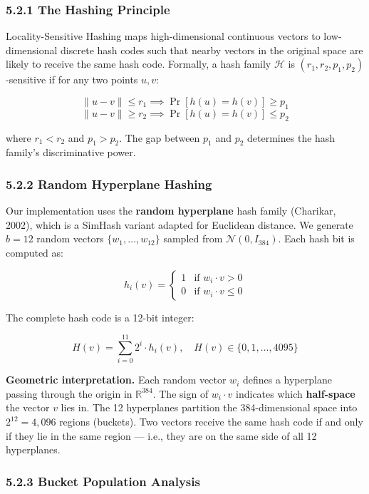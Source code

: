 \documentclass[12pt, a4paper, oneside]{report}
\begin{document}
\subsubsection{5.2.1 The Hashing Principle}\label{the-hashing-principle}

Locality-Sensitive Hashing maps high-dimensional continuous vectors to low-dimensional discrete hash codes such that nearby vectors in the original space are likely to receive the same hash code. Formally, a hash family \(\mathcal{H}\) is \((r_1, r_2, p_1, p_2)\)-sensitive if for any two points \(u, v\):

\[\|u - v\| \leq r_1 \implies \Pr[h(u) = h(v)] \geq p_1\] \[\|u - v\| \geq r_2 \implies \Pr[h(u) = h(v)] \leq p_2\]

where \(r_1 < r_2\) and \(p_1 > p_2\). The gap between \(p_1\) and \(p_2\) determines the hash family's discriminative power.

\subsubsection{5.2.2 Random Hyperplane Hashing}\label{random-hyperplane-hashing}

Our implementation uses the \textbf{random hyperplane} hash family (Charikar, 2002), which is a SimHash variant adapted for Euclidean distance. We generate \(b = 12\) random vectors \(\{w_1, \ldots, w_{12}\}\) sampled from \(\mathcal{N}(0, I_{384})\). Each hash bit is computed as:

\[h_i(v) = \begin{cases} 1 & \text{if } w_i \cdot v > 0 \\ 0 & \text{if } w_i \cdot v \leq 0 \end{cases}\]

The complete hash code is a 12-bit integer:

\[H(v) = \sum_{i=0}^{11} 2^i \cdot h_i(v), \quad H(v) \in \{0, 1, \ldots, 4095\}\]

\textbf{Geometric interpretation.} Each random vector \(w_i\) defines a hyperplane passing through the origin in \(\mathbb{R}^{384}\). The sign of \(w_i \cdot v\) indicates which \textbf{half-space} the vector \(v\) lies in. The 12 hyperplanes partition the 384-dimensional space into \(2^{12} = 4{,}096\) regions (buckets). Two vectors receive the same hash code if and only if they lie in the same region --- i.e., they are on the same side of all 12 hyperplanes.

\subsubsection{5.2.3 Bucket Population Analysis}\label{bucket-population-analysis}
\end{document}
